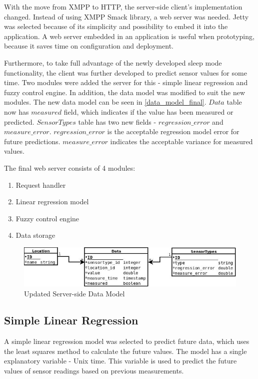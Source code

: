 With the move from XMPP to HTTP, the server-side client's implementation changed. Instead of using XMPP Smack library, a web server was needed. Jetty was selected because of its simplicity and possibility to embed it into the application. A web server embedded in an application is useful when prototyping, because it saves time on configuration and deployment. 

Furthermore, to take full advantage of the newly developed sleep mode functionality, the client was further developed to predict sensor values for some time. Two modules were added the server for this - simple linear regression and fuzzy control engine. In addition, the data model was modified to suit the new modules. The new data model can be seen in \autoref{data_model_final}. $Data$ table now has $measured$ field, which indicates if the value has been measured or predicted. $SensorTypes$ table has two new fields - $regression\_error$ and $measure\_error$. $regression\_error$ is the acceptable regression model error for future predictions. $measure\_error$ indicates the acceptable variance for measured values. 

The final web server consists of 4 modules:
\begin{enumerate}
\item Request handler
\item Linear regression model
\item Fuzzy control engine
\item Data storage
\end{enumerate}

\begin{figure}[h!]
\centering
\includegraphics[scale=0.6]{4/figures/data_model_final.jpg}
\caption{Updated Server-side Data Model}
\label{data_model_final}
\end{figure}

\subsection{Simple Linear Regression}

A simple linear regression model was selected to predict future data, which uses the least squares method to calculate the future values.  The model has a single explanatory variable - Unix time. This variable is used to predict the future values of sensor readings based on previous measurements. 

